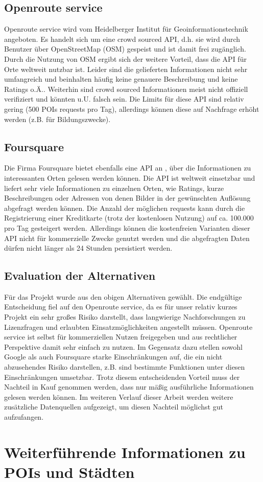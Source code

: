 \subsection{Openroute service}
Openroute service \cite{openroute2019} wird vom Heidelberger Institut für Geoinformationstechnik angeboten. Es handelt sich um eine crowd sourced API, d.h. sie wird durch Benutzer über OpenStreetMap (OSM) \cite{openstreetmap2020} gespeist und ist damit frei zugänglich. Durch die Nutzung von OSM ergibt sich der weitere Vorteil, dass die API für Orte weltweit nutzbar ist. Leider sind die gelieferten Informationen nicht sehr umfangreich und beinhalten häufig keine genauere Beschreibung und keine Ratings o.Ä.. Weiterhin sind crowd sourced Informationen meist nicht offiziell verifiziert und könnten u.U. falsch sein. Die Limits für diese API sind relativ gering (500 POIs requests pro Tag), allerdings können diese auf Nachfrage erhöht werden (z.B. für Bildungszwecke).

\subsection{Foursquare}
Die Firma Foursquare bietet ebenfalls eine API an \cite{foursquare2019}, über die Informationen zu interessanten Orten gelesen werden können. Die API ist weltweit einsetzbar und liefert sehr viele Informationen zu einzelnen Orten, wie Ratings, kurze Beschreibungen oder Adressen von denen Bilder in der gewünschten Auflösung abgefragt werden können. Die Anzahl der möglichen requests kann durch die Registrierung einer Kreditkarte (trotz der kostenlosen Nutzung) auf ca. 100.000 pro Tag gesteigert werden. Allerdings können die kostenfreien Varianten dieser API nicht für kommerzielle Zwecke genutzt werden und die abgefragten Daten dürfen nicht länger als 24 Stunden persistiert werden. 

\subsection{Evaluation der Alternativen}
Für das Projekt wurde aus den obigen Alternativen gewählt. Die endgültige Entscheidung fiel auf den Openroute service, da es für unser relativ kurzes Projekt ein sehr großes Risiko darstellt, dass langwierige Nachforschungen zu Lizenzfragen und erlaubten Einsatzmöglichkeiten angestellt müssen. Openroute service ist selbst für kommerziellen Nutzen freigegeben und aus rechtlicher Perspektive damit sehr einfach zu nutzen. Im Gegensatz dazu stellen sowohl Google als auch Foursquare starke Einschränkungen auf, die ein nicht abzusehendes Risiko darstellen, z.B. sind bestimmte Funktionen unter diesen Einschränkungen umsetzbar. Trotz diesem entscheidenden Vorteil muss der Nachteil in Kauf genommen werden, dass nur mäßig ausführliche Informationen gelesen werden können. Im weiteren Verlauf dieser Arbeit werden weitere zusätzliche Datenquellen aufgezeigt, um diesen Nachteil möglichst gut aufzufangen.

\section{Weiterführende Informationen zu POIs und Städten} 